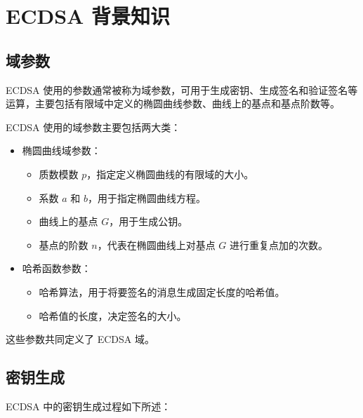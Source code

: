 \documentclass[main\_\_CN.tex]{subfiles}
\begin{document}

\label{sec:ecdsa-terminology}

\section{ECDSA 背景知识}
\subsection{域参数}

ECDSA 使用的参数通常被称为域参数，可用于生成密钥、生成签名和验证签名等运算，主要包括有限域中定义的椭圆曲线参数、曲线上的基点和基点阶数等。

ECDSA 使用的域参数主要包括两大类：

\begin{itemize}
    \item 椭圆曲线域参数：
          \begin{itemize}
              \item 质数模数 $p$，指定定义椭圆曲线的有限域的大小。
              \item 系数 $a$ 和 $b$，用于指定椭圆曲线方程。
              \item 曲线上的基点 $G$，用于生成公钥。
              \item 基点的阶数 $n$，代表在椭圆曲线上对基点 $G$ 进行重复点加的次数。
          \end{itemize}
    \item 哈希函数参数：
          \begin{itemize}
              \item 哈希算法，用于将要签名的消息生成固定长度的哈希值。
              \item 哈希值的长度，决定签名的大小。
          \end{itemize}
\end{itemize}

这些参数共同定义了 ECDSA 域。

\subsection{密钥生成}

ECDSA 中的密钥生成过程如下所述：
\end{document}
